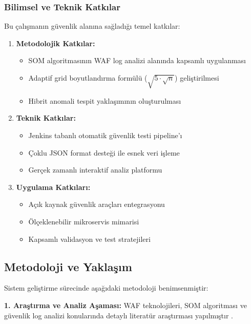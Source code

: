 \subsubsection{Bilimsel ve Teknik Katkılar}

Bu çalışmanın güvenlik alanına sağladığı temel katkılar:

\begin{enumerate}
    \item \textbf{Metodolojik Katkılar:}
    \begin{itemize}
        \item SOM algoritmasının WAF log analizi alanında kapsamlı uygulanması
        \item Adaptif grid boyutlandırma formülü ($\sqrt{5 \cdot \sqrt{n}}$) geliştirilmesi
        \item Hibrit anomali tespit yaklaşımının oluşturulması
    \end{itemize}
    
    \item \textbf{Teknik Katkılar:}
    \begin{itemize}
        \item Jenkins tabanlı otomatik güvenlik testi pipeline'ı
        \item Çoklu JSON format desteği ile esnek veri işleme
        \item Gerçek zamanlı interaktif analiz platformu
    \end{itemize}
    
    \item \textbf{Uygulama Katkıları:}
    \begin{itemize}
        \item Açık kaynak güvenlik araçları entegrasyonu
        \item Ölçeklenebilir mikroservis mimarisi
        \item Kapsamlı validasyon ve test stratejileri
    \end{itemize}
\end{enumerate}

\subsection{Metodoloji ve Yaklaşım}

Sistem geliştirme sürecinde aşağıdaki metodoloji benimsenmiştir:

\textbf{1. Araştırma ve Analiz Aşaması:} WAF teknolojileri, SOM algoritması ve güvenlik log analizi konularında detaylı literatür araştırması yapılmıştır \cite{som_cybersecurity2021,kohonen2001self}.

